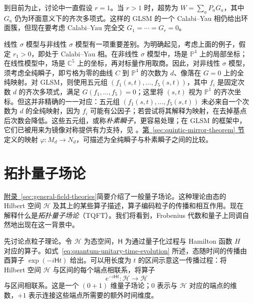 到目前为止，讨论中一直假设 $r=1$。当 $r>1$ 时，超势为 $W=\sum_aP_aG_a$，其中 $G_a$ 仍为环面意义下的齐次多项式。这样的 GLSM 的一个 Calabi--Yau 相仍给出环面簇，但现在要考虑 Calabi--Yau 完全交 $G_1=\cdots=G_r=0$。

线性 $\sigma$ 模型与非线性 $\sigma$ 模型有一项重要差别。为明确起见，考虑上面的例子，假定 $r_1>0$，即处于 Calabi--Yau 相。在非线性 $\sigma$ 模型中，场是 $\mathbb P^4$ 上的局部坐标；在线性模型中，场是 $\mathbb C^5$ 上的坐标，再对标量作用取商。因此，对非线性 $\sigma$ 模型，须考虑全纯瞬子，即亏格为零的曲线 $C$ 到 $\mathbb P^4$ 的次数为 $d$、像落在 $G=0$ 上的全纯映射。对 GLSM，则使用五元组 $(f_1(s,t),\ldots,f_5(s,t))$，其中 $f_i$ 是固定次数 $d$ 的齐次多项式，满足 $G(f_1,\ldots,f_5)=0$；这里将 $(s,t)$ 视为 $\mathbb P^1$ 的齐次坐标。但这并非精确的一一对应：五元组 $(f_1(s,t),\ldots,f_5(s,t))$ 未必来自一个次数为 $d$ 的全纯映射，因为 $f_i$ 可能有公因子；若尝试将其解释为映射，在去掉基点后次数会降低。这些五元组，或称\emph{朴素瞬子}，更容易处理；在 GLSM 的框架中，它们已被用来为镜像对称提供有力支持，见 。\hyperref[sec:quintic-mirror-theorem]{第~\ref*{sec:quintic-mirror-theorem} 节}定义的映射 $\varphi:M_d\to N_d$，可描述为全纯瞬子与朴素瞬子之间的比较。

\section{拓扑量子场论}\label{sec:topological-qft}
\hyperref[sec:general-field-theories]{附录~\ref*{sec:general-field-theories}}简要介绍了一般量子场论。这种理论由态的 Hilbert 空间 $\mathcal H$ 及其上的某些算子描述，算子编码粒子的传播和相互作用。现在解释什么是\emph{拓扑量子场论}（TQFT）。我们将看到，Frobenius 代数和量子上同调自然地出现在这一背景中。

先讨论点粒子理论。令 $\mathcal H$ 为态空间，$\mathsf H$ 为通过量子化过程与 Hamilton 函数 $H$ 对应的算子。如式~\eqref{eq:quantum-unitary-time-evolution} 所述，态随时间的传播由酉算子 $\exp(-i\mathsf Ht)$ 给出。可以用长度为 $t$ 的区间示意这一传播过程：将 Hilbert 空间 $\mathcal H$ 与区间的每个端点相联系，将算子
\[
e^{-i\mathsf Ht}:\mathcal H\longrightarrow\mathcal H
\]
与区间相联系。这是一个 $(0+1)$ 维量子场论；$0$ 表示与 $\mathcal H$ 对应的端点的维数，$+1$ 表示连接这些端点所需要的额外时间维度。

